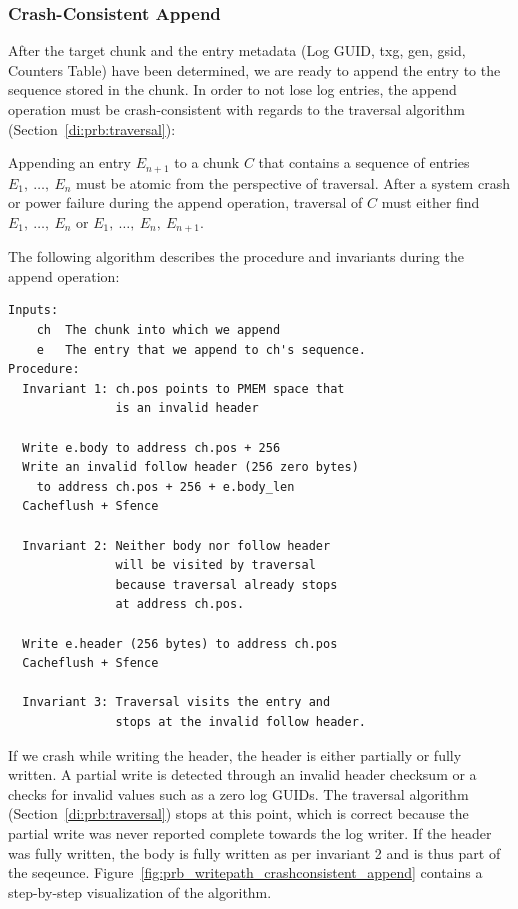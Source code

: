 \documentclass[12pt,a4paper,twoside]{book}
\begin{document}

\subsubsection{Crash-Consistent Append}\label{di:prb:write:crashconsistency}
After the target chunk and the entry metadata (Log GUID, txg, gen, gsid, Counters Table) have been determined, we are ready to append the entry to the sequence stored in the chunk.
In order to not lose log entries, the append operation must be crash-consistent with regards to the traversal algorithm (Section~\ref{di:prb:traversal}):
\begin{displayquote}
    Appending an entry $E_{n+1}$ to a chunk $C$ that contains a sequence of entries $E_1,~\dots,~E_n$ must be atomic from the perspective of traversal.
    After a system crash or power failure during the append operation, traversal of $C$ must either find $E_1,~\dots,~E_n$ or $E_1,~\dots,~E_n,~E_{n+1}$.
\end{displayquote}
The following algorithm describes the procedure and invariants during the append operation:
\begin{lstlisting}[style=figurepseudocode]
Inputs:
    ch  The chunk into which we append
    e   The entry that we append to ch's sequence.
Procedure:
  Invariant 1: ch.pos points to PMEM space that
               is an invalid header

  Write e.body to address ch.pos + 256
  Write an invalid follow header (256 zero bytes)
    to address ch.pos + 256 + e.body_len
  Cacheflush + Sfence

  Invariant 2: Neither body nor follow header
               will be visited by traversal
               because traversal already stops
               at address ch.pos.

  Write e.header (256 bytes) to address ch.pos
  Cacheflush + Sfence

  Invariant 3: Traversal visits the entry and
               stops at the invalid follow header.
\end{lstlisting}
If we crash while writing the header, the header is either partially or fully written.
A partial write is detected through an invalid header checksum or a checks for invalid values such as a zero log GUIDs.
The traversal algorithm (Section~\ref{di:prb:traversal}) stops at this point, which is correct because the partial write was never reported complete towards the log writer.
If the header was fully written, the body is fully written as per invariant 2 and is thus part of the seqeunce.
Figure~\ref{fig:prb_writepath_crashconsistent_append} contains a step-by-step visualization of the algorithm.
\end{document}
